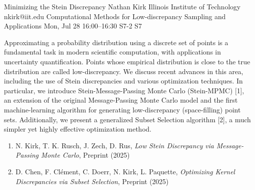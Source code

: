 \documentclass[12pt,lettersize,oneside]{book} %
\begin{document}
\begin{talk}
  {Minimizing the Stein Discrepancy}%
  {Nathan Kirk}%
  {Illinois Institute of Technology}%
  {nkirk@iit.edu}%
  {Computational Methods for Low-discrepancy Sampling and Applications}%
  {}%
  {Mon, Jul 28 16:00--16:30}%
  {S7-2}%
  {S7}%
    
   
Approximating a probability distribution using a discrete set of points is a fundamental task in modern scientific computation, with applications in uncertainty quantification. Points whose empirical distribution is close to the true distribution are called low-discrepancy. We discuss recent advances in this area, including the use of Stein discrepancies and various optimization techniques. In particular, we introduce Stein-Message-Passing Monte Carlo (Stein-MPMC) [1], an extension of the original Message-Passing Monte Carlo model and the first machine-learning algorithm for generating low-discrepancy (space-filling) point sets. Additionally, we present a generalized Subset Selection algorithm [2], a much simpler yet highly effective optimization method.

\medskip

\begin{enumerate}
 \item[{[1]}] N. Kirk, T. K. Rusch, J. Zech, D. Rus, \textit{Low Stein Discrepancy via Message-Passing Monte Carlo}, Preprint (2025)
 \item[{[2]}] D. Chen, F. Cl\'ement, C. Doerr, N. Kirk, L. Paquette, \textit{Optimizing Kernel Discrepancies via Subset Selection}, Preprint (2025)
\end{enumerate}


\end{talk}
\end{document}
